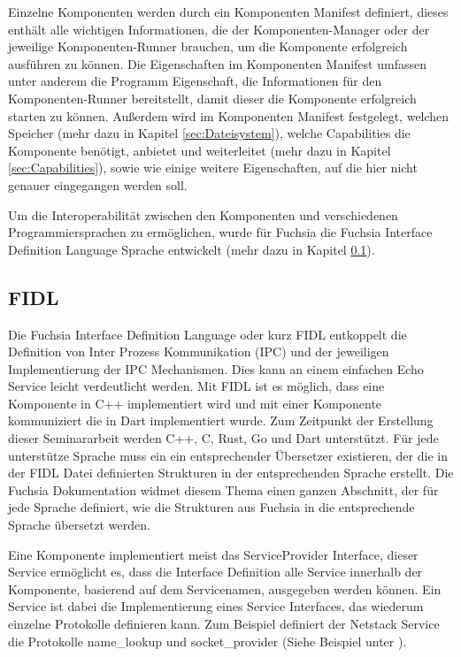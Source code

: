 \documentclass[a4paper]{scrartcl}
\begin{document}
Einzelne Komponenten werden durch ein Komponenten Manifest definiert, dieses enthält alle wichtigen Informationen, die der Komponenten-Manager oder der jeweilige Komponenten-Runner brauchen, um die Komponente erfolgreich ausführen zu können. \cite{https://fuchsia.googlesource.com/fuchsia/+/master/sdk/fidl/fuchsia.sys2/decls/component_decl.fidl} 
Die Eigenschaften im Komponenten Manifest umfassen unter anderem die Programm Eigenschaft,  die Informationen für den Komponenten-Runner bereitstellt, damit dieser die Komponente erfolgreich starten zu können. Außerdem wird im Komponenten Manifest festgelegt, welchen Speicher (mehr dazu in Kapitel \ref{sec:Dateisystem}),  welche Capabilities die Komponente benötigt, anbietet und weiterleitet (mehr dazu in Kapitel \ref{sec:Capabilities}), sowie wie einige weitere Eigenschaften, auf die hier nicht genauer eingegangen werden soll.

Um die Interoperabilität zwischen den Komponenten und verschiedenen Programmiersprachen zu ermöglichen, wurde für Fuchsia die Fuchsia Interface Definition Language Sprache entwickelt (mehr dazu in Kapitel \ref{sec:FIDL}).

\subsection{FIDL}
\label{sec:FIDL}
Die Fuchsia Interface Definition Language oder kurz FIDL entkoppelt die Definition von Inter Prozess Kommunikation (IPC) und der jeweiligen Implementierung der IPC Mechanismen. Dies kann an einem einfachen Echo Service leicht verdeutlicht werden. Mit FIDL ist es möglich, dass eine Komponente in C++ implementiert wird und mit einer Komponente kommuniziert die in Dart implementiert wurde. Zum Zeitpunkt der Erstellung dieser Seminararbeit werden C++, C, Rust, Go und Dart unterstützt. Für jede unterstütze Sprache muss ein ein entsprechender Übersetzer existieren, der die in der FIDL Datei definierten Strukturen in der entsprechenden Sprache erstellt. Die Fuchsia Dokumentation widmet diesem Thema einen ganzen Abschnitt, der für jede Sprache definiert, wie die Strukturen aus Fuchsia in die entsprechende Sprache übersetzt werden.\cite{https://fuchsia.dev/fuchsia-src/reference/fidl/bindings/overview}

Eine Komponente implementiert meist das ServiceProvider Interface, dieser Service ermöglicht es, dass die Interface Definition alle Service innerhalb der Komponente, basierend auf dem Servicenamen, ausgegeben werden können. Ein Service ist dabei die Implementierung eines Service Interfaces, das wiederum einzelne Protokolle definieren kann. Zum Beispiel definiert der Netstack Service die Protokolle name\_lookup und socket\_provider (Siehe Beispiel unter \cite{https://fuchsia.dev/fuchsia-src/concepts/components/services?hl=en}).
\end{document}
